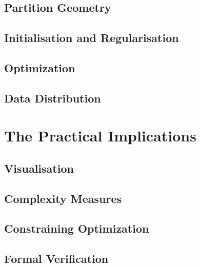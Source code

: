 \documentclass[nobib,oneside]{tufte-book}
\begin{document}
\chapter{Partition Geometry}\label{ch:partition_geometry}



\chapter{Initialisation and Regularisation}



\chapter{Optimization}



\chapter{Data Distribution}



\part{The Practical Implications}

\chapter{Visualisation}\label{ch:visualisation}



\chapter{Complexity Measures}



\chapter{Constraining Optimization}\label{ch:constraining_optimization}



\chapter{Formal Verification}
\end{document}
